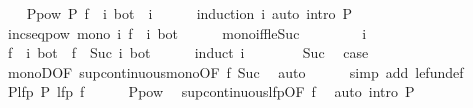 \begin{isabellebody}
\isanewline
\ \ \isamarkupfalse%
\ P{\isacharunderscore}pow{\isacharcolon}\ {\isachardoublequoteopen}P\ {\isacharparenleft}{\isacharparenleft}f\ {\isacharcircum}{\isacharcircum}\ i{\isacharparenright}\ bot{\isacharparenright}{\isachardoublequoteclose}\ \ i\isanewline
\ \ \ \ \isamarkupfalse%
\ {\isacharparenleft}induction\ i{\isacharparenright}\ {\isacharparenleft}auto\ intro{\isacharbang}{\isacharcolon}\ P{\isacharparenright}\isanewline
\ \ \isamarkupfalse%
\ incseq{\isacharunderscore}pow{\isacharcolon}\ {\isachardoublequoteopen}mono\ {\isacharparenleft}{\isasymlambda}i{\isachardot}\ {\isacharparenleft}f\ {\isacharcircum}{\isacharcircum}\ i{\isacharparenright}\ bot{\isacharparenright}{\isachardoublequoteclose}\isanewline
\ \ \ \ \isamarkupfalse%
\ mono{\isacharunderscore}iff{\isacharunderscore}le{\isacharunderscore}Suc\isanewline
\ \ \isamarkupfalse%
\isanewline
\ \ \ \ \isamarkupfalse%
\ i\ \isamarkupfalse%
\ {\isachardoublequoteopen}{\isacharparenleft}f\ {\isacharcircum}{\isacharcircum}\ i{\isacharparenright}\ bot\ {\isasymle}\ {\isacharparenleft}f\ {\isacharcircum}{\isacharcircum}\ {\isacharparenleft}Suc\ i{\isacharparenright}{\isacharparenright}\ bot{\isachardoublequoteclose}\isanewline
\ \ \ \ \isamarkupfalse%
\ {\isacharparenleft}induct\ i{\isacharparenright}\isanewline
\ \ \ \ \ \ \isamarkupfalse%
\ Suc\ \isamarkupfalse%
\ {\isacharquery}case\ \isamarkupfalse%
\ monoD{\isacharbrackleft}OF\ sup{\isacharunderscore}continuous{\isacharunderscore}mono{\isacharbrackleft}OF\ f{\isacharbrackright}\ Suc{\isacharbrackright}\ \isamarkupfalse%
\ auto\isanewline
\ \ \ \ \isamarkupfalse%
\ {\isacharparenleft}simp\ add{\isacharcolon}\ le{\isacharunderscore}fun{\isacharunderscore}def{\isacharparenright}\isanewline
\ \ \isamarkupfalse%
\isanewline
\ \ \isamarkupfalse%
\ P{\isacharunderscore}lfp{\isacharcolon}\ {\isachardoublequoteopen}P\ {\isacharparenleft}lfp\ f{\isacharparenright}{\isachardoublequoteclose}\isanewline
\ \ \ \ \isamarkupfalse%
\ P{\isacharunderscore}pow\ \isamarkupfalse%
\ sup{\isacharunderscore}continuous{\isacharunderscore}lfp{\isacharbrackleft}OF\ f{\isacharbrackright}\ \isamarkupfalse%
\ {\isacharparenleft}auto\ intro{\isacharbang}{\isacharcolon}\ P{\isacharparenright}\isanewline
\isanewline
\ \ \isamarkupfalse%

\end{isabellebody}
